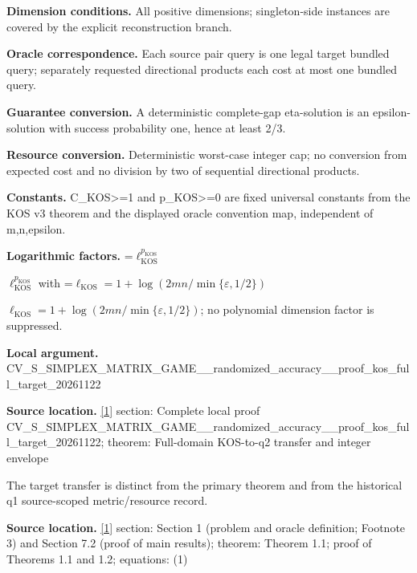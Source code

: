 \documentclass[10pt,a4paper]{article}
\newcommand{\AtlasMath}[1]{\par\begingroup\centering\setbox0=\hbox{$\displaystyle #1$}\ifdim\wd0>1.4\linewidth\typeout{ATLAS WIDE FORMULA: \the\wd0}\fi\ifdim\wd0>\linewidth\resizebox{\linewidth}{!}{\box0}\else\box0\fi\par\endgroup}
\newcommand{\AtlasInlineMath}[1]{\begingroup\setbox0=\hbox{$#1$}\ifdim\wd0>.4\linewidth\endgroup\AtlasMath{#1}\else\endgroup$#1$\fi}
\begin{document}
\textbf{Dimension conditions.} All positive dimensions; singleton-side instances are covered by the explicit reconstruction branch.



\textbf{Oracle correspondence.} Each source pair query is one legal target bundled query; separately requested directional products each cost at most one bundled query.



\textbf{Guarantee conversion.} A deterministic complete-gap eta-solution is an epsilon-solution with success probability one, hence at least 2/3.



\textbf{Resource conversion.} Deterministic worst-case integer cap; no conversion from expected cost and no division by two of sequential directional products.



\textbf{Constants.} C\_KOS>=1 and p\_KOS>=0 are fixed universal constants from the KOS v3 theorem and the displayed oracle convention map, independent of m,n,epsilon.



\textbf{Logarithmic factors.} \AtlasInlineMath{\ell_{\mathrm{KOS}}^{p_{\mathrm{KOS}}}} with \AtlasInlineMath{\ell_{\mathrm{KOS}}=1+\log(2mn/\min\{\varepsilon,1/2\})}; no polynomial dimension factor is suppressed.



\textbf{Local argument.} CV\_S\_SIMPLEX\_MATRIX\_GAME\allowbreak{}\_\_randomized\_accuracy\_\_p\allowbreak{}roof\_kos\_full\_target\_202\allowbreak{}61122



\textbf{Source location.} \href{https://arxiv.org/pdf/2601.02347v3}{[1]} section: Complete local proof CV\_S\_SIMPLEX\_MATRIX\_GAME\allowbreak{}\_\_randomized\_accuracy\_\_p\allowbreak{}roof\_kos\_full\_target\_202\allowbreak{}61122; theorem: Full-domain KOS-to-q2 transfer and integer envelope



The target transfer is distinct from the primary theorem and from the historical q1 source-scoped metric/resource record.



\textbf{Source location.} \href{https://arxiv.org/pdf/2601.02347v3}{[1]} section: Section 1 (problem and oracle definition; Footnote 3) and Section 7.2 (proof of main results); theorem: Theorem 1.1; proof of Theorems 1.1 and 1.2; equations: (1)
\end{document}
